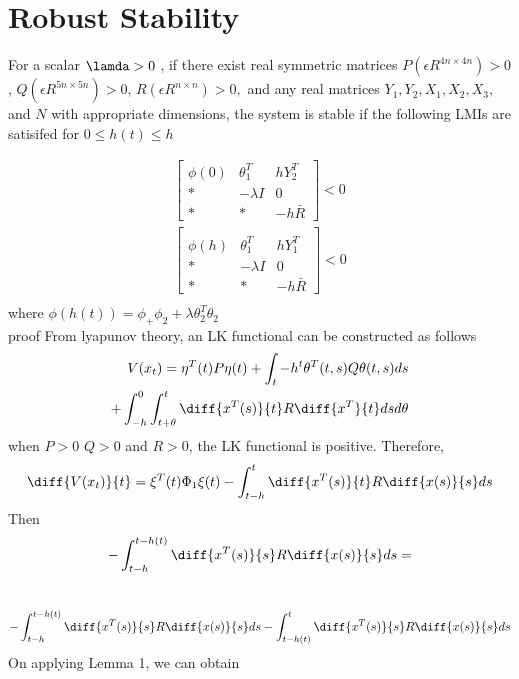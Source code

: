 \documentclass[journal]{IEEEtran}
\begin{document}
\section{Robust Stability}
For a scalar $\lamda >0$ , if there exist real symmetric matrices $P (\epsilon R^{4n \times 4n}) >0$, $Q (\epsilon R^{5n\times5n}) > 0$, $R(\epsilon R^{n\times n})>0,$
and any real matrices $Y_1, Y_2,X_1,X_2,X_3,$ and $N$ with appropriate dimensions, the system is stable if the following LMIs are satisifed for $0\leq h(t) \leq h$

  \begin{align}
  \begin{bmatrix}
     \phi(0)&\theta _1^T&hY_2^T\\
     *&-\lambda I&0\\
     *& * & -h\bar{R}
   \end{bmatrix} < 0 \\
  \begin{bmatrix} \\
     \phi(h)&\theta _1^T&hY_1^T\\
     *&-\lambda I&0\\
     *& * & -h\bar{R}
   \end{bmatrix} < 0 \\
 \end{align}
where $\phi(h(t))=\phi _+ \phi _2 + \lambda \theta _2^T \theta _2$   
\\
proof
From lyapunov theory, an LK functional can be constructed as follows
\begin{align}
  V(x_t) = \eta ^T (t)P \eta(t) + \int _t-h^t \theta ^T(t,s)Q\theta(t,s)ds  \\ +\int _{-h} ^0 \int _{t+\theta}^t\diff{x^T(s)}{t}R\diff{x^T}{t}dsd\theta
\end{align}
when $P>0$ $Q> 0$ and $R>0$, the LK functional is positive. 
Therefore,
\begin{equation}
  \diff{V(x_t)}{t}= \xi ^T (t)\Phi _1 \xi (t) - \int _{t-h}^t \diff{x^T(s)}{t}R\diff{x(s)}{s} ds
\end{equation}
Then 
 \begin{equation}
   - \int ^{t-h(t)}_{t-h}\diff{x^T(s)}{s}R\diff{x(s)}{s}ds =
\end{equation}
\\
\begin{equation}
 -\int^{t-h(t)}_{t-h}\diff{x^T(s)}{s}R\diff{x(s)}{s}ds   -\int^{t}_{t-h(t)}\diff{x^T(s)}{s}R\diff{x(s)}{s}ds
 \end{equation}
On applying Lemma 1, we can obtain 
\end{document}
